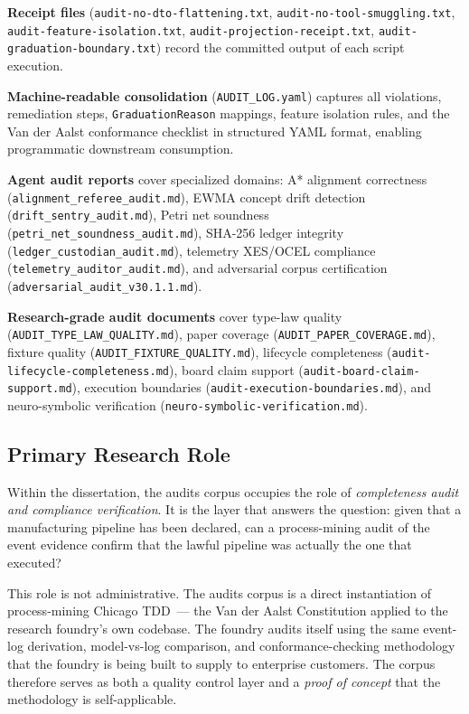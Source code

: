 \textbf{Receipt files} (\texttt{audit-no-dto-flattening.txt},
\texttt{audit-no-tool-smuggling.txt}, \texttt{audit-feature-isolation.txt},
\texttt{audit-projection-receipt.txt}, \texttt{audit-graduation-boundary.txt})
record the committed output of each script execution.

\textbf{Machine-readable consolidation} (\texttt{AUDIT\_LOG.yaml}) captures all
violations, remediation steps, \texttt{GraduationReason} mappings, feature
isolation rules, and the Van der Aalst conformance checklist in structured YAML
format, enabling programmatic downstream consumption.

\textbf{Agent audit reports} cover specialized domains: A* alignment
correctness (\texttt{alignment\_referee\_audit.md}), EWMA concept drift
detection (\texttt{drift\_sentry\_audit.md}), Petri net soundness
(\texttt{petri\_net\_soundness\_audit.md}), SHA-256 ledger integrity
(\texttt{ledger\_custodian\_audit.md}), telemetry XES/OCEL compliance
(\texttt{telemetry\_auditor\_audit.md}), and adversarial corpus certification
(\texttt{adversarial\_audit\_v30.1.1.md}).

\textbf{Research-grade audit documents} cover type-law quality
(\texttt{AUDIT\_TYPE\_LAW\_QUALITY.md}), paper coverage
(\texttt{AUDIT\_PAPER\_COVERAGE.md}), fixture quality
(\texttt{AUDIT\_FIXTURE\_QUALITY.md}), lifecycle completeness
(\texttt{audit-lifecycle-completeness.md}), board claim support
(\texttt{audit-board-claim-support.md}), execution boundaries
(\texttt{audit-execution-boundaries.md}), and neuro-symbolic verification
(\texttt{neuro-symbolic-verification.md}).

\subsection{Primary Research Role}
\label{sec:audits-identity-role}

Within the dissertation, the audits corpus occupies the role of
\emph{completeness audit and compliance verification}. It is the layer that
answers the question: given that a manufacturing pipeline has been declared, can
a process-mining audit of the event evidence confirm that the lawful pipeline
was actually the one that executed?

This role is not administrative. The audits corpus is a direct instantiation of
process-mining Chicago TDD~--- the Van der Aalst Constitution applied to the
research foundry's own codebase. The foundry audits itself using the same event-
log derivation, model-vs-log comparison, and conformance-checking methodology
that the foundry is being built to supply to enterprise customers. The corpus
therefore serves as both a quality control layer and a \emph{proof of concept}
that the methodology is self-applicable.

